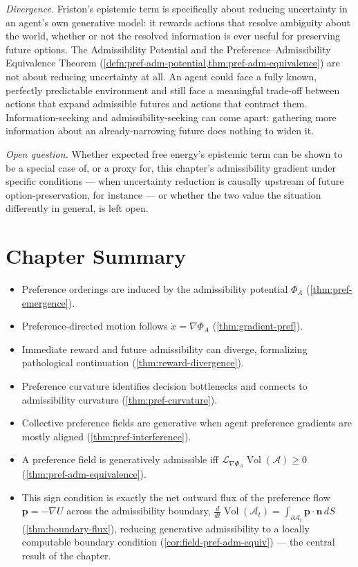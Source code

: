\documentclass[12pt,twoside,openright]{book}
\newcommand{\adm}{\mathcal{A}}
\newcommand{\Vol}{\operatorname{Vol}}
\newenvironment{chapsummary}{%
  \begin{tcolorbox}[colback=DistBlue!5,colframe=DistBlue,
    title={\faBookOpen\enspace Summary},
    fonttitle=\sffamily\bfseries\color{white},
    attach boxed title to top left={yshift=-2mm,xshift=4mm},
    boxed title style={colback=DistBlue,rounded corners}]
  \begin{itemize}[nosep,leftmargin=*]}{%
  \end{itemize}\end{tcolorbox}}
\begin{document}
\emph{Divergence.} Friston's epistemic term is specifically about
reducing uncertainty in an agent's own generative model: it
rewards actions that resolve ambiguity about the world, whether
or not the resolved information is ever useful for preserving
future options. The Admissibility Potential and the
Preference--Admissibility Equivalence Theorem
(\cref{defn:pref-adm-potential,thm:pref-adm-equivalence}) are not
about reducing uncertainty at all. An agent could face a fully
known, perfectly predictable environment and still face a
meaningful trade-off between actions that expand admissible
futures and actions that contract them. Information-seeking and
admissibility-seeking can come apart: gathering more information
about an already-narrowing future does nothing to widen it.

\emph{Open question.} Whether expected free energy's epistemic
term can be shown to be a special case of, or a proxy for, this
chapter's admissibility gradient under specific conditions ---
when uncertainty reduction is causally upstream of future
option-preservation, for instance --- or whether the two value
the situation differently in general, is left open.

\section*{Chapter Summary}
\begin{chapsummary}
  \item Preference orderings are induced by the
        admissibility potential $\Phi_A$
        (\cref{thm:pref-emergence}).
  \item Preference-directed motion follows
        $\dot{x} = \nabla\Phi_A$
        (\cref{thm:gradient-pref}).
  \item Immediate reward and future admissibility can
        diverge, formalizing pathological continuation
        (\cref{thm:reward-divergence}).
  \item Preference curvature identifies decision
        bottlenecks and connects to admissibility curvature
        (\cref{thm:pref-curvature}).
  \item Collective preference fields are generative when
        agent preference gradients are mostly aligned
        (\cref{thm:pref-interference}).
  \item A preference field is generatively admissible iff
        $\mathcal{L}_{\nabla\Phi_A}\Vol(\adm) \ge 0$
        (\cref{thm:pref-adm-equivalence}).
  \item This sign condition is exactly the net outward flux
        of the preference flow $\mathbf{p}=-\nabla U$ across
        the admissibility boundary,
        $\frac{d}{dt}\Vol(\mathcal{A}_t) =
        \int_{\partial\mathcal{A}_t}\mathbf{p}\cdot\mathbf{n}\,dS$
        (\cref{thm:boundary-flux}), reducing generative
        admissibility to a locally computable boundary
        condition (\cref{cor:field-pref-adm-equiv}) --- the
        central result of the chapter.
\end{chapsummary}
\end{document}
